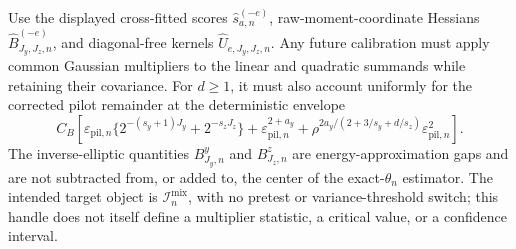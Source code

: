 Use the displayed cross-fitted scores \(\widehat s_{a,n}^{(-e)}\), raw-moment-coordinate Hessians \(\widehat B_{J_y,J_z,n}^{(-e)}\), and diagonal-free kernels \(\widehat U_{e,J_y,J_z,n}\). Any future calibration must apply common Gaussian multipliers to the linear and quadratic summands while retaining their covariance.  For \(d\ge1\), it must also account uniformly for the corrected pilot remainder at the deterministic envelope
\[
C_B\left[
\varepsilon_{\mathrm{pil},n}
\{2^{-(s_y+1)J_y}+2^{-s_zJ_z}\}
+\varepsilon_{\mathrm{pil},n}^{2+a_y}
+\rho^{2a_y/(2+3/s_y+d/s_z)}\varepsilon_{\mathrm{pil},n}^2
\right].
\]
The inverse-elliptic quantities \(B^y_{J_y,n}\) and \(B^z_{J_z,n}\) are energy-approximation gaps and are not subtracted from, or added to, the center of the exact-\(\theta_n\) estimator.  The intended target object is \(\mathcal I_n^{\mathrm{mix}}\), with no pretest or variance-threshold switch; this handle does not itself define a multiplier statistic, a critical value, or a confidence interval.